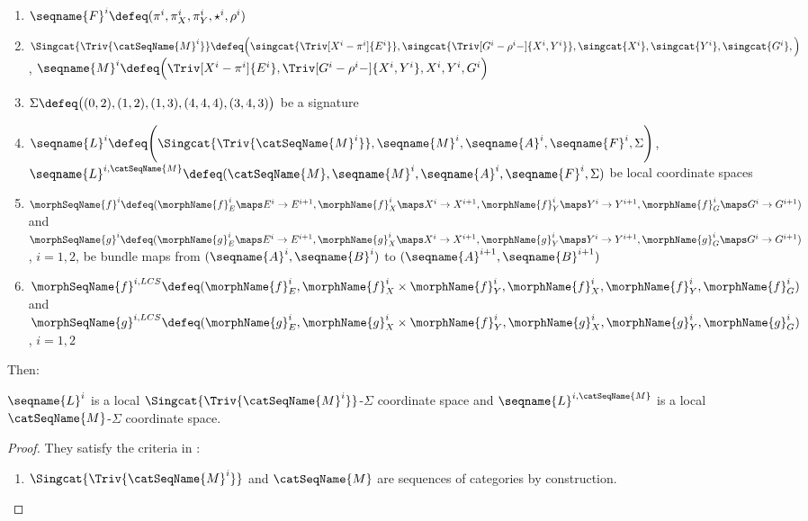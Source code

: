\documentclass{article}
\begin{document}
\begin{theorem}
\begin{enumerate}
\item
$
  \seqname{F}^i \defeq
  (
    \pi^i,
    \pi^i_X,
    \pi^i_Y,
    \star^i,
    \rho^i
  )
$
\item
$
  \Singcat{\Triv{\catSeqName{M}^i}} \defeq
    \Bigl  (
      \singcat{\Triv[X^i-\pi^i]{E^i}},
      \singcat{\Triv[G^i-\rho^i-]{X^i,Y^i}},
      \singcat{X^i},
      \singcat{Y^i},
      \singcat{G^i},
    \Bigr  )
$,
$
  \seqname{M}^i \defeq
    \Bigl (
      \Triv[X^i-\pi^i]{E^i},
      \Triv[G^i-\rho^i-]{X^i,Y^i},
      X^i,
      Y^i,
      G^i
    \Bigr )
$
\item
$
  \Sigma \defeq
  \bigl (
      (0,2),
      (1,2),
      (1,3),
      (4,4,4),
      (3,4,3)
  \bigr )
$
be a signature
\item
$
  \seqname{L}^i \defeq
  \Biggl (
    \Singcat{\Triv{\catSeqName{M}^i}},
    \seqname{M}^i,
    \seqname{A}^i,
    \seqname{F}^i,
    \Sigma
  \Biggr )
$,
$
  \seqname{L}^{i,\catSeqName{M}} \defeq
  (
    \catSeqName{M},
    \seqname{M}^i,
    \seqname{A}^i,
    \seqname{F}^i,
    \Sigma
  )
$
be local coordinate spaces
\item
$
   \morphSeqName{f}^i \defeq
     (
       \morphName{f}^i_E \maps E^i \to E^{i+1},
       \morphName{f}^i_X \maps X^i \to X^{i+1},
       \morphName{f}^i_Y \maps Y^i \to Y^{i+1},
       \morphName{f}^i_G \maps G^i \to G^{i+1}
     )
$
and
$
   \morphSeqName{g}^i \defeq
     (
       \morphName{g}^i_E \maps E^i \to E^{i+1},
       \morphName{g}^i_X \maps X^i \to X^{i+1},
       \morphName{g}^i_Y \maps Y^i \to Y^{i+1},
       \morphName{g}^i_G \maps G^i \to G^{i+1}
     )
$,
$i=1,2$, be bundle maps from $(\seqname{A}^i,\seqname{B}^i)$ to
$(\seqname{A}^{i+1},\seqname{B}^{i+1})$
\item
$
  \morphSeqName{f}^{i,LCS} \defeq
    (
      \morphName{f}^i_E,
      \morphName{f}^i_X \times \morphName{f}^i_Y,
      \morphName{f}^i_X,
      \morphName{f}^i_Y,
      \morphName{f}^i_G
    )
$
and
$
  \morphSeqName{g}^{i,LCS} \defeq
    (
      \morphName{g}^i_E,
      \morphName{g}^i_X \times \morphName{f}^i_Y,
      \morphName{g}^i_X,
      \morphName{g}^i_Y,
      \morphName{g}^i_G
    )
$,
$i=1,2$
\end{enumerate}

Then:

$\seqname{L}^i$ is a local $\Singcat{\Triv{\catSeqName{M}^i}}$-$\Sigma$
coordinate space and $\seqname{L}^{i,\catSeqName{M}}$ is a local
$\catSeqName{M}$-$\Sigma$ coordinate space.

\begin{proof}
They satisfy the criteria in :
\begin{enumerate}
\item $\Singcat{\Triv{\catSeqName{M}^i}}$ and $\catSeqName{M}$ are
sequences of categories by construction.


\end{enumerate}
\end{proof}
\end{theorem}
\end{document}
